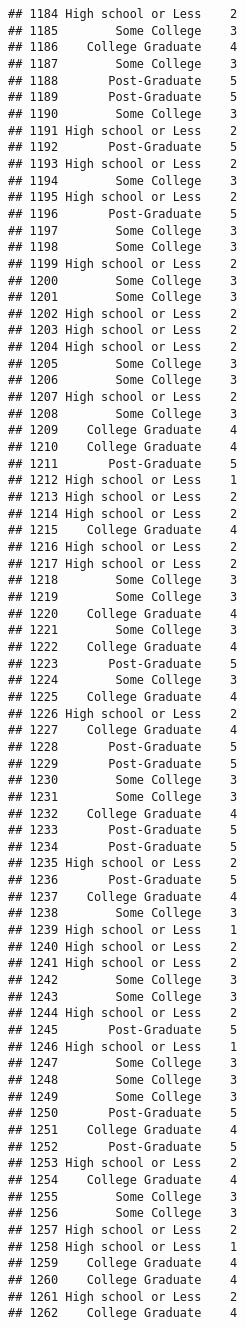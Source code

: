\documentclass[
]{article}
\begin{document}
\begin{verbatim}
## 1184 High school or Less    2
## 1185        Some College    3
## 1186    College Graduate    4
## 1187        Some College    3
## 1188       Post-Graduate    5
## 1189       Post-Graduate    5
## 1190        Some College    3
## 1191 High school or Less    2
## 1192       Post-Graduate    5
## 1193 High school or Less    2
## 1194        Some College    3
## 1195 High school or Less    2
## 1196       Post-Graduate    5
## 1197        Some College    3
## 1198        Some College    3
## 1199 High school or Less    2
## 1200        Some College    3
## 1201        Some College    3
## 1202 High school or Less    2
## 1203 High school or Less    2
## 1204 High school or Less    2
## 1205        Some College    3
## 1206        Some College    3
## 1207 High school or Less    2
## 1208        Some College    3
## 1209    College Graduate    4
## 1210    College Graduate    4
## 1211       Post-Graduate    5
## 1212 High school or Less    1
## 1213 High school or Less    2
## 1214 High school or Less    2
## 1215    College Graduate    4
## 1216 High school or Less    2
## 1217 High school or Less    2
## 1218        Some College    3
## 1219        Some College    3
## 1220    College Graduate    4
## 1221        Some College    3
## 1222    College Graduate    4
## 1223       Post-Graduate    5
## 1224        Some College    3
## 1225    College Graduate    4
## 1226 High school or Less    2
## 1227    College Graduate    4
## 1228       Post-Graduate    5
## 1229       Post-Graduate    5
## 1230        Some College    3
## 1231        Some College    3
## 1232    College Graduate    4
## 1233       Post-Graduate    5
## 1234       Post-Graduate    5
## 1235 High school or Less    2
## 1236       Post-Graduate    5
## 1237    College Graduate    4
## 1238        Some College    3
## 1239 High school or Less    1
## 1240 High school or Less    2
## 1241 High school or Less    2
## 1242        Some College    3
## 1243        Some College    3
## 1244 High school or Less    2
## 1245       Post-Graduate    5
## 1246 High school or Less    1
## 1247        Some College    3
## 1248        Some College    3
## 1249        Some College    3
## 1250       Post-Graduate    5
## 1251    College Graduate    4
## 1252       Post-Graduate    5
## 1253 High school or Less    2
## 1254    College Graduate    4
## 1255        Some College    3
## 1256        Some College    3
## 1257 High school or Less    2
## 1258 High school or Less    1
## 1259    College Graduate    4
## 1260    College Graduate    4
## 1261 High school or Less    2
## 1262    College Graduate    4

\end{verbatim}
\end{document}
